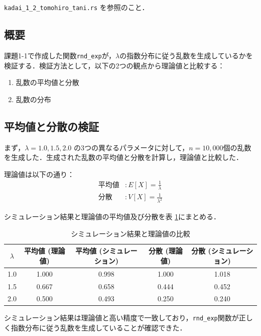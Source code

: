 \documentclass[fleqn, a4paper. 12pt]{jsarticle}
\begin{document}
    \texttt{kadai\_1\_2\_tomohiro\_tani.rs} を参照のこと．

    \subsection*{概要}
    課題1-1で作成した関数\texttt{rnd\_exp}が，$\lambda$の指数分布に従う乱数を生成しているかを検証する．検証方法として，以下の2つの観点から理論値と比較する：
    \begin{enumerate}
        \item 乱数の平均値と分散
        \item 乱数の分布
    \end{enumerate}

    \subsection*{平均値と分散の検証}
    まず，$\lambda = 1.0, 1.5, 2.0$ の3つの異なるパラメータに対して，$n = 10,000$個の乱数を生成した．生成された乱数の平均値と分散を計算し，理論値と比較した．

    理論値は以下の通り：
    \begin{align*}
        \text{平均値} & : E[X] = \frac{1}{\lambda} \\
        \text{分散} & : V[X] = \frac{1}{\lambda^2}
    \end{align*}

    \quad

    シミュレーション結果と理論値の平均値及び分散を表 \ref{table:1}にまとめる．

    \begin{table}[h]
      \centering
      \caption{シミュレーション結果と理論値の比較}
      \begin{tabular}{|c|c|c|c|c|}
      \hline
      $\lambda$ & 平均値 (理論値) & 平均値 (シミュレーション) & 分散 (理論値) & 分散 (シミュレーション) \\
      \hline
      1.0 & 1.000 & 0.998 & 1.000 & 1.018 \\
      1.5 & 0.667 & 0.658 & 0.444 & 0.452 \\
      2.0 & 0.500 & 0.493 & 0.250 & 0.240 \\
      \hline
      \end{tabular}
      \label{table:1}
    \end{table}

    シミュレーション結果は理論値と高い精度で一致しており，\texttt{rnd\_exp}関数が正しく指数分布に従う乱数を生成していることが確認できた．
\end{document}
